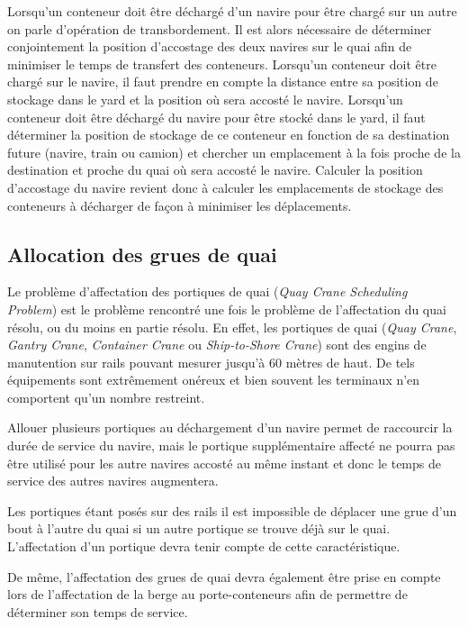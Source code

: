 Lorsqu'un conteneur doit être déchargé d'un navire pour être chargé sur un autre on parle d'opération de transbordement. Il est alors nécessaire de déterminer conjointement la position d'accostage des deux navires sur le quai afin de minimiser le temps de transfert des conteneurs. 
Lorsqu'un conteneur doit être chargé sur le navire, il faut prendre en compte la distance entre sa position de stockage dans le yard et la position où sera accosté le navire.
Lorsqu'un conteneur doit être déchargé du navire pour être stocké dans le yard, il faut déterminer la position de stockage de ce conteneur en fonction de sa destination future (navire, train ou camion) et chercher un emplacement à la fois proche de la destination et proche du quai où sera accosté le navire. Calculer la position d'accostage du navire revient donc à calculer les emplacements de stockage des conteneurs à décharger de façon à minimiser les déplacements.


\subsection{Allocation des grues de quai}

Le problème d'affectation des portiques de quai (\textit{Quay Crane Scheduling Problem}) est le problème rencontré une fois le problème de l'affectation du quai résolu, ou du moins en partie résolu. 
En effet, les portiques de quai (\textit{Quay Crane}, \textit{Gantry Crane}, \textit{Container Crane} ou \textit{Ship-to-Shore Crane}) sont des engins de manutention sur rails pouvant mesurer jusqu'à 60 mètres de haut. 
De tels équipements sont extrêmement onéreux et bien souvent les terminaux n'en comportent qu'un nombre restreint. 

Allouer plusieurs portiques au déchargement d'un navire permet de raccourcir la durée de service du navire, mais le portique supplémentaire affecté ne pourra pas être utilisé pour les autre navires accosté au même instant et donc le temps de service des autres navires augmentera.

Les portiques étant posés sur des rails il est impossible de déplacer une grue d'un bout à l'autre du quai si un autre portique se trouve déjà sur le quai. L'affectation d'un portique devra tenir compte de cette caractéristique. 

De même, l'affectation des grues de quai devra également être prise en compte lors de l'affectation de la berge au porte-conteneurs afin de permettre de déterminer son temps de service. 

